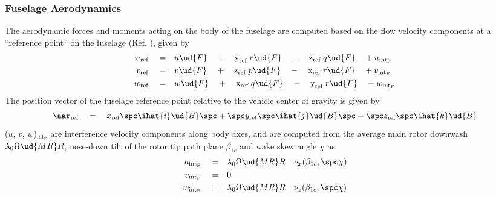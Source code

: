 \subsubsection{Fuselage Aerodynamics}
\label{sec:fusloads}
The aerodynamic forces and moments acting on the body of the fuselage are computed based on the flow velocity components at a ``reference point'' on the fuselage (Ref. \cite{Howlett}), given by 
\begin{align*}
u_\textrm{ref} \quad = \quad &u\ud{F} \quad + \quad \textrm{y}_\textrm{ref } r\ud{F} \quad -\quad  \textrm{z}_\textrm{ref } q\ud{F} \quad + u_{\textrm{int}_\textrm{F}} \\
v_\textrm{ref} \quad = \quad &v\ud{F} \quad + \quad \textrm{z}_\textrm{ref } p\ud{F} \quad -\quad  \textrm{x}_\textrm{ref } r\ud{F} \quad + v_{\textrm{int}_\textrm{F}} \\
w_\textrm{ref} \quad = \quad &w\ud{F} \quad + \quad \textrm{x}_\textrm{ref } q\ud{F} \quad -\quad  \textrm{y}_\textrm{ref } r\ud{F} \quad + w_{\textrm{int}_\textrm{F}} 
\end{align*}
The position vector of the fuselage reference point relative to the vehicle center of gravity is given by 
\[ \aar_\textrm{ref} \quad = \quad x_\textrm{ref} \spc  \ihat{i}\ud{B} \spc  + \spc  y_\textrm{ref} \spc  \ihat{j}\ud{B} \spc  + \spc  z_\textrm{ref} \spc  \ihat{k}\ud{B} \]
($u$, $v$, $w$)$_{\textrm{int}_\textrm{F}}$ are interference velocity components along body axes, and are computed from the average main rotor downwash $\lambda_0 \Omega\ud{MR} R$, nose-down tilt of the rotor tip path plane $\beta_{1c}$ and wake skew angle $\chi$ as 
\begin{equation}
\begin{aligned}
u_{\textrm{int}_\textrm{F}} \quad = \quad & \lambda_0 \Omega\ud{MR} R \quad \nu_x(\beta_{1c}, \spc \chi) \\
v_{\textrm{int}_\textrm{F}} \quad = \quad & 0 \\
w_{\textrm{int}_\textrm{F}} \quad = \quad & \lambda_0 \Omega\ud{MR} R \quad \nu_z(\beta_{1c}, \spc \chi) 
\end{aligned}
\end{equation}

